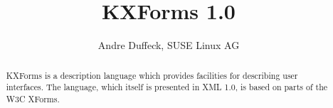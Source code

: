 \documentclass[a4paper,12pt]{scrreprt}
\title{KXForms 1.0}
\author{Andre Duffeck, SUSE Linux AG}
\begin{document}
\maketitle
\tableofcontents

\begin{abstract}
KXForms is a description language which provides facilities for describing user interfaces. The language, which itself is presented in XML 1.0, is based on parts of the W3C XForms.
\end{abstract}

\renewcommand{\baselinestretch}{1.5}







\end{document}
